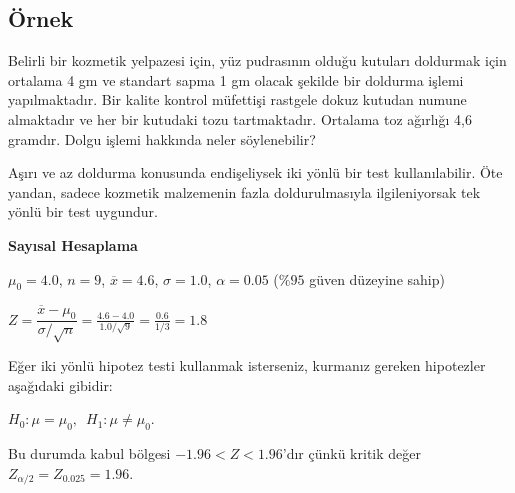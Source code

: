 \documentclass[
  12pt,
]{book}
\begin{document}
\hypertarget{uxf6rnek}{%
\subsection{Örnek}\label{uxf6rnek}}

Belirli bir kozmetik yelpazesi için, yüz pudrasının olduğu kutuları doldurmak için ortalama 4 gm ve standart sapma 1 gm olacak şekilde bir doldurma işlemi yapılmaktadır. Bir kalite kontrol müfettişi rastgele dokuz kutudan numune almaktadır ve her bir kutudaki tozu tartmaktadır. Ortalama toz ağırlığı 4,6 gramdır. Dolgu işlemi hakkında neler söylenebilir?

Aşırı ve az doldurma konusunda endişeliysek iki yönlü bir test kullanılabilir. Öte yandan, sadece kozmetik malzemenin fazla doldurulmasıyla ilgileniyorsak tek yönlü bir test uygundur.

\textbf{Sayısal Hesaplama}

\(\mu_{0} = 4.0\), \(n=9\), \(\overline{x} = 4.6\), \(\sigma = 1.0\), \(\alpha = 0.05\) (\(\%95\) güven düzeyine sahip)

\(Z = \dfrac{\overline{x} - \mu_{0}}{\sigma / \sqrt{n}} = \frac{4.6 - 4.0}{1.0 / \sqrt{9}} = \frac{0.6}{1/3} = 1.8\)

Eğer iki yönlü hipotez testi kullanmak isterseniz, kurmanız gereken hipotezler aşağıdaki gibidir:

\(H_{0}: \mu = \mu_{0},\,\,\, H_{1}: \mu \neq \mu_{0}\).

Bu durumda kabul bölgesi \(−1.96 < Z < 1.96\)'dır çünkü kritik değer \(Z_{\alpha/2} = Z_{0.025} = 1.96\).
\end{document}
